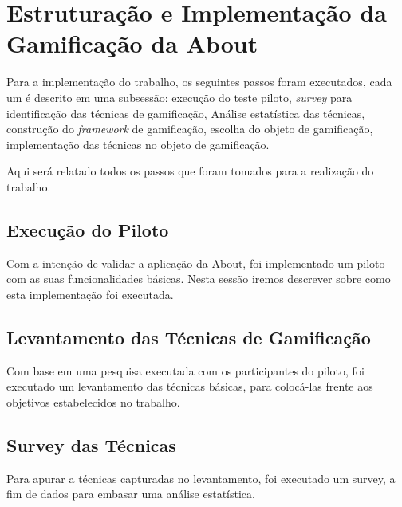 \chapter[Estruturação e Implementação da Gamificação da About]{Estruturação e Implementação da Gamificação da About}

Para a implementação do trabalho, os seguintes
passos foram executados, cada um é
descrito em uma subsessão: execução do teste piloto, \textit{survey} para identificação das técnicas de gamificação,
Análise estatística das técnicas, construção do \textit{framework} de gamificação, escolha do objeto de gamificação,
implementação das técnicas no objeto de gamificação.

Aqui será relatado todos os passos que foram tomados para a realização do trabalho.




\section{Execução do Piloto}
\label{sec:execucao_do_piloto}
Com a intenção de validar a aplicação da About, foi implementado um piloto com as suas funcionalidades
básicas. Nesta sessão iremos descrever sobre como esta implementação foi executada.

\section{Levantamento das Técnicas de Gamificação}
\label{sec:gamifição}
Com base em uma pesquisa executada com os participantes do piloto, foi executado um levantamento das
técnicas básicas, para colocá-las frente aos objetivos estabelecidos no trabalho.

\section{Survey das Técnicas}
\label{sec:gamifição}
Para apurar a técnicas capturadas no levantamento, foi executado um survey, a fim de dados para
embasar uma análise estatística.

